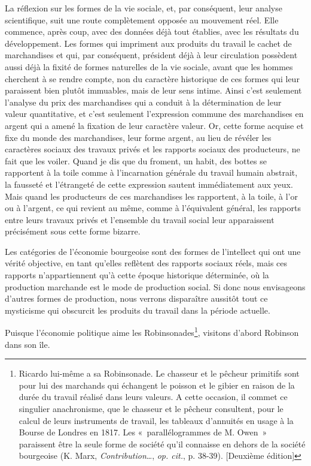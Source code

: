\documentclass[french,twoside]{book} %
\begin{document}
La réflexion sur les formes de la vie sociale, et, par conséquent, leur analyse scientifique, suit une route complètement opposée au mouvement réel. Elle commence, après coup, avec des données déjà tout établies, avec les résultats du développement. Les formes qui impriment aux produits du travail le cachet de marchandises et qui, par conséquent, président déjà à leur circulation possèdent aussi déjà la fixité de formes naturelles de la vie sociale, avant que les hommes cherchent à se rendre compte, non du caractère historique de ces formes qui leur paraissent bien plutôt immuables, mais de leur sens intime. Ainsi c’est seulement l’analyse du prix des marchandises qui a conduit à la détermination de leur valeur quantitative, et c’est seulement l’expression commune des marchandises en argent qui a amené la fixation de leur caractère valeur. Or, cette forme acquise et fixe du monde des marchandises, leur forme argent, au lieu de révéler les caractères sociaux des travaux privés et les rapports sociaux des producteurs, ne fait que les voiler. Quand je dis que du froment, un habit, des bottes se rapportent à la toile comme à l’incarnation générale du travail humain abstrait, la fausseté et l’étrangeté de cette expression sautent immédiatement aux yeux. Mais quand les producteurs de ces marchandises les rapportent, à la toile, à l’or ou à l’argent, ce qui revient au même, comme à l’équivalent général, les rapports entre leurs travaux privés et l’ensemble du travail social leur apparaissent précisément sous cette forme bizarre.\par
Les catégories de l’économie bourgeoise sont des formes de l’intellect qui ont une vérité objective, en tant qu’elles reflètent des rapports sociaux réels, mais ces rapports n’appartiennent qu’à cette époque historique déterminée, où la production marchande est le mode de production social. Si donc nous envisageons d’autres formes de production, nous verrons disparaître aussitôt tout ce mysticisme qui obscurcit les produits du travail dans la période actuelle.\par
Puisque l’économie politique aime les Robinsonades\footnote{Ricardo lui-même a sa Robinsonade. Le chasseur et le pêcheur primitifs sont pour lui des marchands qui échangent le poisson et le gibier en raison de la durée du travail réalisé dans leurs valeurs. A cette occasion, il commet ce singulier anachronisme, que le chasseur et le pêcheur consultent, pour le calcul de leurs instruments de travail, les tableaux d’annuités en usage à la Bourse de Londres en 1817. Les « parallélogrammes de M. Owen » paraissent être la seule forme de société qu’il connaisse en dehors de la société bourgeoise (K. Marx, \emph{Contribution}…, \emph{op. cit.}, p. 38-39). [Deuxième édition]}, visitons d’abord Robinson dans son île.\par
\end{document}
